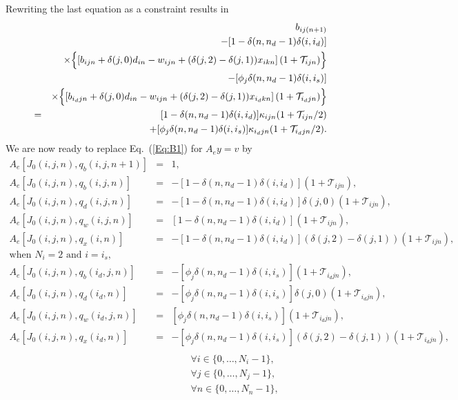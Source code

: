 \documentclass{report}[fleqn,12pt]
\begin{document}
Rewriting the last equation as a constraint results in
\begin{eqnarray}
	&&b_{ij(n+1)} 
	  \nonumber  \\
	&& - [1 - \delta(n, n_d-1)\delta(i, i_d)] \nonumber\\
	&& \times \Bigl\{ \left[b_{ijn} + \delta(j, 0)d_{in} - w_{ijn}
	+ (\delta(j, 2) - \delta(j, 1))x_{ikn} \right](1 + \mathcal{T}_{ijn}) \Bigr\}
	\nonumber \\
	&&- [\phi_j\delta(n, n_d-1)\delta(i, i_s)] \nonumber \\
	&& \times \Bigl\{ \left[b_{i_djn} + \delta(j, 0)d_{in} - w_{ijn}
	+ (\delta(j, 2) - \delta(j, 1))x_{i_dkn}
	\right](1 + \mathcal{T}_{i_djn})
	\Bigr\}
	\nonumber \\
	&=& [1 - \delta(n, n_d-1)\delta(i, i_d)] \kappa_{ijn} (1 + \mathcal{T}_{ijn}/2)
	\nonumber\\ &&
	+ [\phi_j\delta(n, n_d-1)\delta(i, i_s)]
	\kappa_{i_djn}(1 + \mathcal{T}_{i_djn}/2).
\end{eqnarray}
We are now ready to replace Eq.~(\ref{Eq:B1}) for $A_ey = v$ by
\begin{eqnarray}
        \label{Eq:B2}
        A_e[J_0(i, j, n), q_b(i, j, n+1)] &=& 1, \nonumber \\
        A_e[J_0(i, j, n), q_b(i, j, n)] &=& - [1 - \delta(n, n_d-1)\delta(i, i_d)]
		(1 + \mathcal{T}_{ijn}), \nonumber \\
        A_e[J_0(i, j, n), q_d(i, j, n)] &=& - [1 - \delta(n, n_d-1)\delta(i, i_d)]
		\delta(j, 0) (1 + \mathcal{T}_{ijn}), \nonumber \\
        A_e[J_0(i, j, n), q_w(i, j, n)] &=& [1 - \delta(n, n_d-1)\delta(i, i_d)]
	(1 + \mathcal{T}_{ijn}),\nonumber \\
        A_e[J_0(i, j, n), q_x(i, n)] &=& - [1 - \delta(n, n_d-1)\delta(i, i_d)]
                (\delta(j, 2) - \delta(j, 1))
		(1 + \mathcal{T}_{ijn}), \nonumber \\
		\text{when $N_i =2$ and $i = i_s$,} && \nonumber\\
        A_e[J_0(i, j, n), q_b(i_d, j, n)] &=& - [\phi_j\delta(n, n_d-1)\delta(i, i_s)]
		(1 + \mathcal{T}_{i_djn}), \nonumber \\
        A_e[J_0(i, j, n), q_d(i_d, n)] &=&  -[\phi_j\delta(n, n_d-1)\delta(i, i_s)]
		\delta(j, 0)(1 + \mathcal{T}_{i_djn}), \nonumber \\
        A_e[J_0(i, j, n), q_w(i_d, j, n)] &=& [\phi_j\delta(n, n_d-1)\delta(i, i_s)]
	(1 + \mathcal{T}_{i_djn}), \nonumber\\
        A_e[J_0(i, j, n), q_x(i_d, n)] &=& - [\phi_j\delta(n, n_d-1)\delta(i, i_s)]
                (\delta(j, 2) - \delta(j, 1))
		(1 + \mathcal{T}_{i_djn}), \nonumber \\
                \nonumber \\
        &&\qquad\forall i \in \{0,\ldots, N_i-1\},\nonumber\\
        &&\qquad\forall j \in \{0,\ldots, N_j-1\},\nonumber\\
        &&\qquad\forall n \in \{0,\ldots, N_n-1\}, \nonumber
\end{eqnarray}
\end{document}
